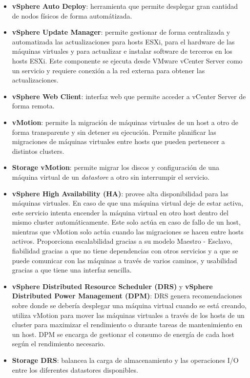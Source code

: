 \begin{itemize}
    

    \item \textbf{vSphere Auto Deploy}: herramienta que permite desplegar gran cantidad de nodos físicos de forma automátizada.
    
    \item \textbf{vSphere Update Manager}: permite gestionar de forma centralizada y automatizada las actualizaciones para hosts ESXi, para el hardware de las máquinas virtuales y para actualizar e instalar software de terceros en los hosts ESXi. Este componente se ejecuta desde VMware vCenter Server como un servicio y requiere conexión a la red externa para obtener las actualizaciones.
   
    \item \textbf{vSphere Web Client}: interfaz web que permite acceder a vCenter Server de forma remota.
    
    \item \textbf{vMotion}: permite la migración de máquinas virtuales de un host a otro de forma transparente y sin detener su ejecución. Permite planificar las migraciones de máquinas virtuales entre hosts que pueden pertenecer a distintos clusters.
    
    \item \textbf{Storage vMotion}: permite migrar los discos y configuración de una máquina virtual de un \textit{datastore} a otro sin interrumpir el servicio.
    
    \item \textbf{vSphere High Availability (HA)}: provee alta disponibilidad para las máquinas virtuales. En caso de que una máquina virtual deje de estar activa, este servicio intenta encender la máquina  virtual en otro host dentro del mismo cluster automáticamente. Este solo actúa en caso de fallo de un host, mientras que vMotion solo actúa cuando las migraciones se hacen entre hosts activos. Proporciona escalabilidad gracias a su modelo Maestro - Esclavo, fiabilidad gracias a que no tiene dependencias con otros servicios y a que se puede comunicar con las máquinas a través de varios caminos, y usabilidad gracias a que tiene una interfaz sencilla.
    
    \item \textbf{vSphere Distributed Resource Scheduler (DRS)} y \textbf{vSphere Distributed Power Management (DPM)}: DRS genera recomendaciones sobre donde se debería desplegar una máquina virtual cuando se está creando, utiliza vMotion para mover las máquinas virtuales a través de los hosts de un cluster para maximizar el rendimiento o durante tareas de mantenimiento en un host. DPM se encarga de gestionar el consumo de energía de cada host según el rendimiento necesario.
    \item \textbf{Storage DRS}: balancea la carga de almacenamiento y las operaciones I/O entre los diferentes datastores disponibles.
    

\end{itemize}
